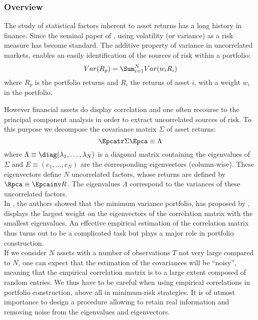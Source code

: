 \subsubsection{Overview}
The study of statistical factors inherent to asset returns has a long history in finance. Since the seminal paper of \cite{Markowitz1952}, using volatility (or variance) as a risk measure has become standard. The additive property of variance in uncorrelated markets, enables an easily identification of the sources of risk within a portfolio:
\begin{equation*}
  Var(R_p) = \Sum_{i=1}^N Var(w_i R_i)
\end{equation*}
where $R_p$ is the portfolio returns and $R_i$ the returns of asset $i$, with a weight $w_i$ in the portfolio. 

However financial assets do display correlation and one often recourse to the principal component analysis in order to extract uncorrelated sources of risk. To this purpose we decompose the covariance matrix $\Sigma$ of asset returns:
\begin{equation*}
  \Epcatr \Sigma \Epca \equiv \Lambda
\end{equation*}
where $\Lambda \equiv \diag(\lambda_1, \dots, \lambda_N)$ is a diagonal matrix containing the eigenvalues of $\Sigma$ and $E \equiv (e_1, \dots, e_N)$ are the corresponding eigenvectors (column-wise). These eigenvectors define $N$ uncorrelated factors, whose returns are defined by $\Rpca \equiv \Epcainv R$. The eigenvalues $\Lambda$ correspond to the variances of these uncorrelated factors.  \\

In \cite{Bouchaud1997}, the authors showed that the minimum variance portfolio, has proposed by \cite{Markowitz1952}, displays the largest weight on the eigenvectors of the correlation matrix with the smallest eigenvalues. An effective empirical estimation of the correlation matrix thus turns out to be a complicated task but plays a major role in portfolio construction. \\

If we consider $N$ assets with a number of observations $T$ not very large compared to $N$, one can expect that the estimation of the covariances will be ``noisy'', meaning that the empirical correlation matrix is to a large extent composed of random entries. We thus have to be careful when using empirical correlations in portfolio construction, above all in minimum-risk strategies. It is of utmost importance to design a procedure allowing to retain real information and removing noise from the eigenvalues and eigenvectors. 


